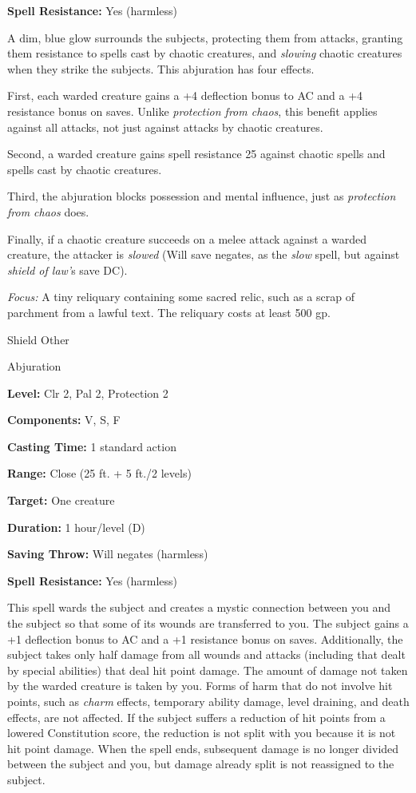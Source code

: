 \documentclass{article}
\begin{document}
\textbf{Spell Resistance:} Yes (harmless)

A dim, blue glow surrounds the subjects, protecting them from attacks, granting 
them resistance to spells cast by chaotic creatures, and \textit{slowing }chaotic 
creatures when they strike the subjects. This abjuration has four effects.

First, each warded creature gains a +4 deflection bonus to AC and a +4 resistance 
bonus on saves. Unlike \textit{protection from chaos}, this benefit applies against 
all attacks, not just against attacks by chaotic creatures.

Second, a warded creature gains spell resistance 25 against chaotic spells and 
spells cast by chaotic creatures.

Third, the abjuration blocks possession and mental influence, just as \textit{protection 
from chaos }does.

Finally, if a chaotic creature succeeds on a melee attack against a warded creature, 
the attacker is \textit{slowed }(Will save negates, as the \textit{slow }spell, 
but against \textit{shield of law'}s save DC).

\textit{Focus: }A tiny reliquary containing some sacred relic, such as a scrap 
of parchment from a lawful text. The reliquary costs at least 500 gp.

\vspace{12pt}
Shield Other

Abjuration

\textbf{Level:} Clr 2, Pal 2, Protection 2

\textbf{Components:} V, S, F

\textbf{Casting Time:} 1 standard action

\textbf{Range:} Close (25 ft. + 5 ft./2 levels)

\textbf{Target:} One creature

\textbf{Duration:} 1 hour/level (D)

\textbf{Saving Throw: }Will negates (harmless)

\textbf{Spell Resistance:} Yes (harmless)

This spell wards the subject and creates a mystic connection between you and the 
subject so that some of its wounds are transferred to you. The subject gains a 
+1 deflection bonus to AC and a +1 resistance bonus on saves. Additionally, the 
subject takes only half damage from all wounds and attacks (including that dealt 
by special abilities) that deal hit point damage. The amount of damage not taken 
by the warded creature is taken by you. Forms of harm that do not involve hit points, 
such as \textit{charm }effects, temporary ability damage, level draining, and death 
effects, are not affected. If the subject suffers a reduction of hit points from 
a lowered Constitution score, the reduction is not split with you because it is 
not hit point damage. When the spell ends, subsequent damage is no longer divided 
between the subject and you, but damage already split is not reassigned to the 
subject.
\end{document}
